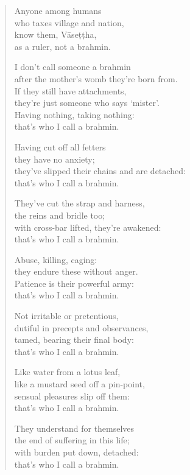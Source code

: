 \documentclass[12pt,openany]{book}%
\begin{document}
\begin{verse}
Anyone among humans \\
who taxes village and nation, \\
know them, \textsanskrit{Vāseṭṭha}, \\
as a ruler, not a brahmin. 

I don’t call someone a brahmin \\
after the mother’s womb they’re born from. \\
If they still have attachments, \\
they’re just someone who says ‘mister’. \\
Having nothing, taking nothing: \\
that’s who I call a brahmin. 

Having cut off all fetters \\
they have no anxiety; \\
they’ve slipped their chains and are detached: \\
that’s who I call a brahmin. 

They’ve cut the strap and harness, \\
the reins and bridle too; \\
with cross-bar lifted, they’re awakened: \\
that’s who I call a brahmin. 

Abuse, killing, caging: \\
they endure these without anger. \\
Patience is their powerful army: \\
that’s who I call a brahmin. 

Not irritable or pretentious, \\
dutiful in precepts and observances, \\
tamed, bearing their final body: \\
that’s who I call a brahmin. 

Like water from a lotus leaf, \\
like a mustard seed off a pin-point, \\
sensual pleasures slip off them: \\
that’s who I call a brahmin. 

They understand for themselves \\
the end of suffering in this life; \\
with burden put down, detached: \\
that’s who I call a brahmin. 


\end{verse}
\end{document}
